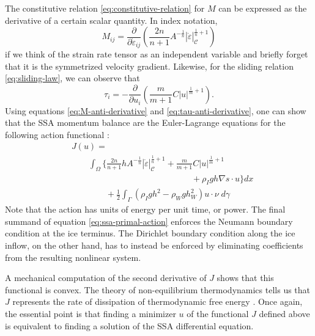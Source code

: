\documentclass[review,oneside]{igs}
\begin{document}
The constitutive relation \eqref{eq:constitutive-relation} for $M$ can be expressed as the derivative of a certain scalar quantity.
In index notation,
\begin{equation}
    M_{ij} = \frac{\partial}{\partial\dot\varepsilon_{ij}}\left(\frac{2n}{n + 1}A^{-\frac{1}{n}}|\dot\varepsilon|_{\mathscr C}^{\frac{1}{n} + 1}\right)
    \label{eq:M-anti-derivative}
\end{equation}
if we think of the strain rate tensor as an independent variable and briefly forget that it is the symmetrized velocity gradient.
Likewise, for the sliding relation \eqref{eq:sliding-law}, we can observe that
\begin{equation}
    \tau_i = -\frac{\partial}{\partial u_i}\left(\frac{m}{m + 1}C|u|^{\frac{1}{m} + 1}\right).
    \label{eq:tau-anti-derivative}
\end{equation}
Using equations \eqref{eq:M-anti-derivative} and \eqref{eq:tau-anti-derivative}, one can show that the SSA momentum balance are the Euler-Lagrange equations for the following action functional \citep{dukowicz2010consistent}:
\begin{align}
    & J(u) = \nonumber\\
    & \qquad\int_\Omega\Bigg\{\frac{2n}{n + 1}hA^{-\frac{1}{n}}|\dot\varepsilon|_{\mathscr{C}}^{\frac{1}{n} + 1} + \frac{m}{m + 1}C|u|^{\frac{1}{m} + 1} \nonumber\\
    & \qquad\qquad\qquad\qquad\qquad\qquad\qquad + \rho_I gh\nabla s\cdot u\Bigg\}dx  \nonumber \\
    & \qquad\qquad + \frac{1}{2}\int_\Gamma\left(\rho_Igh^2 - \rho_Wgh_W^2\right)u\cdot\nu\; d\gamma
    \label{eq:ssa-primal-action}
\end{align}
Note that the action has units of energy per unit time, or power.
The final summand of equation \eqref{eq:ssa-primal-action} enforces the Neumann boundary condition at the ice terminus.
The Dirichlet boundary condition along the ice inflow, on the other hand, has to instead be enforced by eliminating coefficients from the resulting nonlinear system.

A mechanical computation of the second derivative of $J$ shows that this functional is convex.
The theory of non-equilibrium thermodynamics tells us that $J$ represents the rate of dissipation of thermodynamic free energy \citep{edelen1972nonlinear}.
Once again, the essential point is that finding a minimizer $u$ of the functional $J$ defined above is equivalent to finding a solution of the SSA differential equation.
\end{document}
